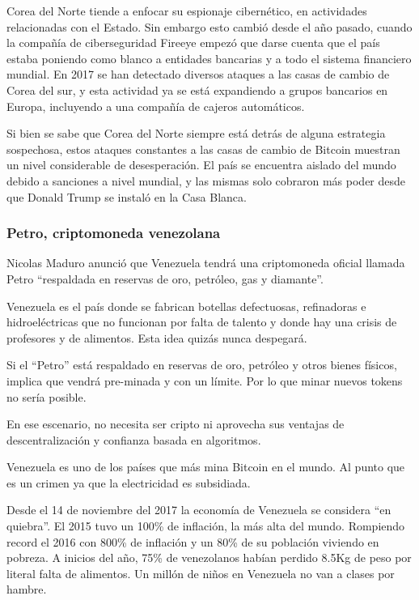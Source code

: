 \documentclass[12pt,letterpaper]{article}
\begin{document}
Corea del Norte tiende a enfocar su espionaje cibern\'etico, en actividades relacionadas con el Estado. Sin embargo esto cambi\'o desde el año pasado, cuando la compañ\'ia de ciberseguridad Fireeye empez\'o que darse cuenta que el pa\'is estaba poniendo como blanco a entidades bancarias y a todo el sistema financiero mundial. En 2017 se han detectado diversos ataques a las casas de cambio de Corea del sur, y esta actividad ya se est\'a expandiendo a grupos bancarios en Europa, incluyendo a una compañ\'ia de cajeros autom\'aticos.
               
               Si bien se sabe que Corea del Norte siempre est\'a detr\'as de alguna estrategia sospechosa, estos ataques constantes a las casas de cambio de Bitcoin muestran un nivel considerable de desesperaci\'on. El pa\'is se encuentra aislado del mundo debido a sanciones a nivel mundial, y las mismas solo cobraron m\'as poder desde que Donald Trump se instal\'o en la Casa Blanca.
              
\subsubsection*{Petro, criptomoneda venezolana}
Nicolas Maduro anunció que Venezuela tendrá una criptomoneda oficial llamada Petro “respaldada en reservas de oro, petróleo, gas y diamante”.

Venezuela es el país donde se fabrican botellas defectuosas, refinadoras e hidroeléctricas que no funcionan por falta de talento y donde hay una crisis de profesores y de alimentos. Esta idea quizás nunca despegará.

Si el “Petro” está respaldado en reservas de oro, petróleo y otros bienes físicos, implica que vendrá pre-minada y con un límite. Por lo que minar nuevos tokens no sería posible.

En ese escenario, no necesita ser cripto ni aprovecha sus ventajas de descentralización y confianza basada en algoritmos. 

Venezuela es uno de los países que más mina Bitcoin en el mundo. Al punto que es un crimen ya que la electricidad es subsidiada.

Desde el 14 de noviembre del 2017 la economía de Venezuela se considera “en quiebra”. El 2015 tuvo un 100\% de inflación, la más alta del mundo. Rompiendo record el 2016 con 800\% de inflación y un 80\% de su población viviendo en pobreza. A inicios del año, 75\% de venezolanos habían perdido 8.5Kg de peso por literal falta de alimentos. Un millón de niños en Venezuela no van a clases por hambre.
\end{document}
